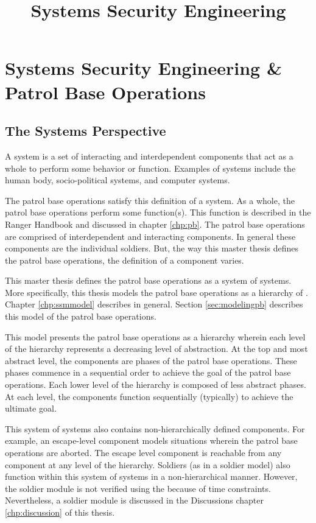 \documentclass[../../main/main.tex]{subfiles}
\begin{document}
\title{Systems Security Engineering}


\chapter{Systems Security Engineering \& Patrol Base Operations}\label{chp:sse}


\section{The Systems Perspective}\label{sec:systems}
A system is a set of interacting and interdependent components that act as a whole to perform some behavior or function.  Examples of systems include the human body, socio-political systems, and computer systems. 

The patrol base operations satisfy this definition of a system.  As a whole, the patrol base operations perform some function(s).  This function is described in the Ranger Handbook \cite{rangermanual} and discussed in chapter \ref{chp:pb}.  The patrol base operations are comprised of interdependent and interacting components.  In general these components are the individual soldiers.  But, the way this master thesis defines the patrol base operations, the definition of a component varies.

This master thesis defines the patrol base operations as a system of systems.  More specifically, this thesis models the patrol base operations as a hierarchy of .  Chapter \ref{chp:ssmmodel} describes  in general.   Section \ref{sec:modelingpb} describes this model of the patrol base operations.  

This model presents the patrol base operations as a hierarchy wherein each level of the hierarchy represents a decreasing level of abstraction.  At the top and most abstract level, the components are phases of the patrol base operations.  These phases commence in a sequential order to achieve the goal of the patrol base operations.  Each lower level of the hierarchy is composed of less abstract phases. At each level, the components function sequentially (typically) to achieve the ultimate goal.  

This system of systems also contains non-hierarchically defined components.  For example, an escape-level component models situations wherein the patrol base operations are aborted.  The escape level component is reachable from any component at any level of the hierarchy.  Soldiers (as in a soldier model) also function within this system of systems in a non-hierarchical manner.  However, the soldier module is not verified using the  because of time constraints.   Nevertheless, a soldier module is discussed in the Discussions chapter \ref{chp:discussion} of this thesis.
\end{document}
